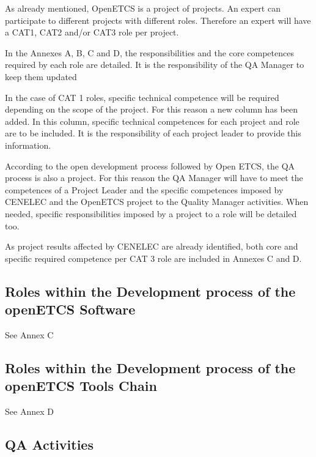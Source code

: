 \documentclass{template/openetcs_article}
\begin{document}
As already mentioned, OpenETCS is a project of projects. An expert can participate to different projects with different roles. Therefore an expert will have a CAT1, CAT2 and/or CAT3 role per project.

In the Annexes A, B, C and D, the responsibilities and the core competences required by each role are detailed. It is the responsibility of the QA Manager to keep them updated

In the case of CAT 1 roles, specific technical competence will be required depending on the scope of the project. For this reason a new column has been added. In this column, specific technical competences for each project and role are to be included. It is the responsibility of each project leader to provide this information.

According to the open development process followed by Open ETCS, the QA process is also a project. For this reason the QA Manager will have to meet the competences of a Project Leader and the specific competences imposed by CENELEC and the OpenETCS project to the Quality Manager activities. When needed, specific responsibilities imposed by a project to a role will be detailed too.

As project results affected by CENELEC are already identified, both core and specific required competence per CAT 3 role are included in Annexes C and D.

\subsection{Roles within the Development process of the openETCS Software}
See Annex C
\subsection{Roles within the Development process of the openETCS Tools Chain}
See Annex D
\subsection{QA Activities}

\end{document}

